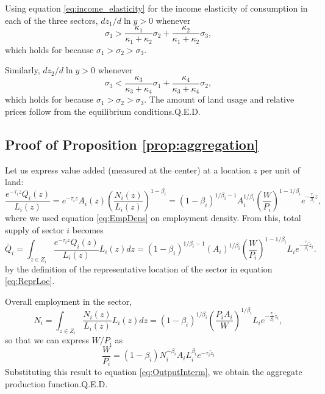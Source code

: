 \documentclass[12pt]{article}
\begin{document}
Using equation \eqref{eq:income_elasticity} for the income elasticity of consumption in each of the three sectors, $dz_1/d\ln y>0$ whenever 
\[
\sigma_1> \frac{\kappa_1}{\kappa_1+\kappa_2}\sigma_2 + \frac{\kappa_2}{\kappa_1+\kappa_2}\sigma_3, 
\]
which holds for because $\sigma_1>\sigma_2>\sigma_3$.

Similarly, $dz_2/d\ln y>0$ whenever 
\[
\sigma_3 < \frac{\kappa_3}{\kappa_3+\kappa_4}\sigma_1 + \frac{\kappa_4}{\kappa_3+\kappa_4}\sigma_2, 
\]
which holds for because $\sigma_1>\sigma_2>\sigma_3$. The amount of land usage and relative prices follow from the equilibrium conditions.\hfill Q.E.D.
\subsection{Proof of Proposition \ref{prop:aggregation}}
Let us express value added (measured at the center) at a location $z$ per unit of land:
\[
\frac{e^{-\tau_i z} Q_i(z)}{L_i(z)} = e^{-\tau_i z} A_i(z)\left(\frac{N_i(z)}{L_i(z)}\right)^{1-\beta_i} = (1-\beta_i)^{1/\beta_i-1}
A_i^{1/\beta_i}\left(\frac{W}{P_i}\right)^{1-1/\beta_i}
 e^{-\frac{\tau_i}{\beta_i} z},
\]
where we used equation \ref{eq:EmpDens} on employment density. From this, total supply of sector $i$ becomes
\begin{equation}
\label{eq:OutputInterm}
\tilde{Q_i} = \int_{z\in Z_i}\frac{e^{-\tau_i z} Q_i(z)}{L_i(z)}L_i(z)dz=(1-\beta_i)^{1/\beta_i-1}
(A_i)^{1/\beta_i}\left(\frac{W}{P_i}\right)^{1-1/\beta_i} L_i e^{-\frac{\tau_i}{\beta_i} \tilde z_i}.
\end{equation}
by the definition of the representative location of the sector in equation \ref{eq:ReprLoc}.

Overall employment in the sector,
\[
N_i = \int_{z\in Z_i}\frac{N_i(z)}{L_i(z)}L_i(z)dz= (1-\beta_i)^{1/\beta_i}
\left(\frac{P_iA_i}{W}\right)^{1/\beta_i} L_i e^{-\frac{\tau_i}{\beta_i} \tilde z_i},
\]
so that we can express $W/P_i$ as
\[
\frac{W}{P_i} = (1-\beta_i)
N_i^{-\beta_i}A_i L_i^{\beta_i}
 e^{-\tau_i\tilde z_i}
\]
Substituting this result to equation \eqref{eq:OutputInterm}, we obtain the aggregate production function.\hfill Q.E.D.
\end{document}

